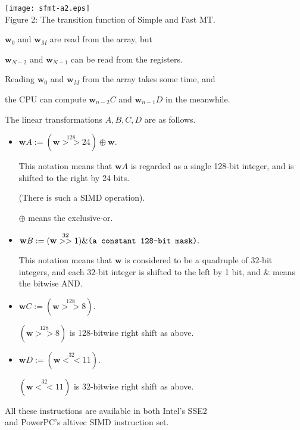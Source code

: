 \documentclass[a4j,12pt,landscape]{jarticle}
\def\bw{{{\mathbf w}}}
\begin{document}
\newpage
\begin{center}
\texttt{[image: sfmt-a2.eps]}
\\
Figure 2: The transition function of Simple and Fast MT.

$\bw_0$ and $\bw_M$ are read from the array, but

$\bw_{N-2}$ and $\bw_{N-1}$ can be read from the registers.
\end{center}

\newpage
Reading $\bw_0$ and $\bw_M$ from the array takes some time, and 

the CPU can compute $\bw_{n-2}C$ and $\bw_{n-1}D$ in the meanwhile.

The linear transformations $A,B,C,D$ are as follows.
\begin{itemize}
\item 
$\bw A := (\bw \stackrel{128}{>>} 24) \oplus \bw.$

This notation means that $\bw A$ is regarded
as a single 128-bit integer, and 
is shifted to the right by 24 bits.

(There is such a SIMD operation).

$\oplus$ means the exclusive-or.

\item
$\bw B := (\bw \stackrel{32}{>>} 1) \& \mbox{\tt (a constant 128-bit mask)}.$

This notation means that $\bw$ is considered to be 
a quadruple of $32$-bit integers, and
each $32$-bit integer is shifted to the left by 1 bit,
and $\&$ means the bitwise AND. 

\newpage

\item 
$\bw C := (\bw \stackrel{128}{>>} 8).$

$(\bw \stackrel{128}{>>} 8)$ is 128-bitwise right shift as above.

\item
$\bw D := (\bw \stackrel{32}{<<} 11).$

$(\bw \stackrel{32}{<<} 11)$ is 32-bitwise right shift as above.

\end{itemize}
All these instructions are available in 
both Intel's SSE2 \\
and PowerPC's altivec SIMD instruction set.
\end{document}
